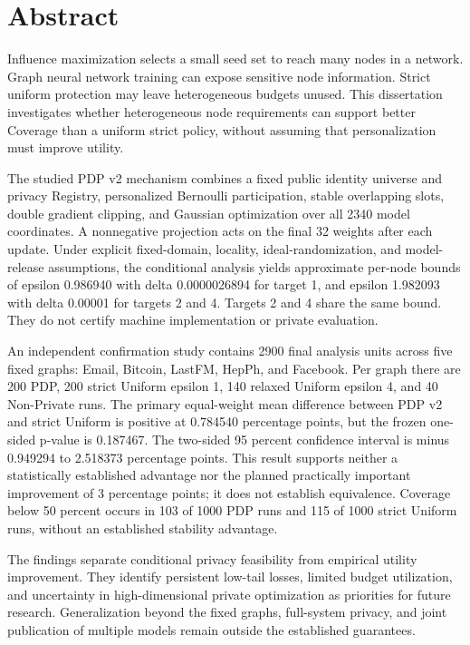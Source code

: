\chapter*{Abstract}
Influence maximization selects a small seed set to reach many nodes in a network. Graph neural network training can expose sensitive node information. Strict uniform protection may leave heterogeneous budgets unused. This dissertation investigates whether heterogeneous node requirements can support better Coverage than a uniform strict policy, without assuming that personalization must improve utility.

The studied PDP v2 mechanism combines a fixed public identity universe and privacy Registry, personalized Bernoulli participation, stable overlapping slots, double gradient clipping, and Gaussian optimization over all 2340 model coordinates. A nonnegative projection acts on the final 32 weights after each update. Under explicit fixed-domain, locality, ideal-randomization, and model-release assumptions, the conditional analysis yields approximate per-node bounds of epsilon 0.986940 with delta 0.0000026894 for target 1, and epsilon 1.982093 with delta 0.00001 for targets 2 and 4. Targets 2 and 4 share the same bound. They do not certify machine implementation or private evaluation.

An independent confirmation study contains 2900 final analysis units across five fixed graphs: Email, Bitcoin, LastFM, HepPh, and Facebook. Per graph there are 200 PDP, 200 strict Uniform epsilon 1, 140 relaxed Uniform epsilon 4, and 40 Non-Private runs. The primary equal-weight mean difference between PDP v2 and strict Uniform is positive at 0.784540 percentage points, but the frozen one-sided p-value is 0.187467. The two-sided 95 percent confidence interval is minus 0.949294 to 2.518373 percentage points. This result supports neither a statistically established advantage nor the planned practically important improvement of 3 percentage points; it does not establish equivalence. Coverage below 50 percent occurs in 103 of 1000 PDP runs and 115 of 1000 strict Uniform runs, without an established stability advantage.

The findings separate conditional privacy feasibility from empirical utility improvement. They identify persistent low-tail losses, limited budget utilization, and uncertainty in high-dimensional private optimization as priorities for future research. Generalization beyond the fixed graphs, full-system privacy, and joint publication of multiple models remain outside the established guarantees.
\clearpage
